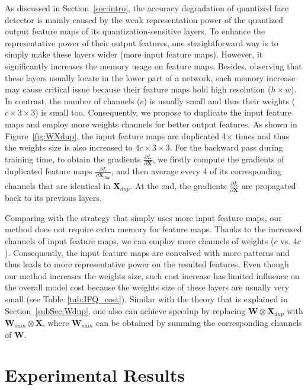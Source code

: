 \documentclass[10pt,twocolumn,letterpaper]{article}
\begin{document}
As discussed in Section~\ref{sec:intro}, the accuracy degradation of quantized face detector is mainly caused by the weak representation power of the quantized output feature maps of its quantization-sensitive layers. To enhance the representative power of their output features, one straightforward way is to simply make these layers wider (more input feature maps). However, it significantly increases the memory usage on feature maps.  Besides, observing that these layers usually locate in the lower part of a network, such memory increase may cause critical issue because their feature maps hold high resolution ($h \times w$). In contrast, the number of channels ($c$) is usually small and thus their weights ($c \times 3 \times 3$) is small too. Consequently, we propose to  duplicate the input feature maps and employ more weights channels for better output features. As shown in Figure~\ref{fig:WXdup}, the input feature maps are duplicated 4$\times$ times and thus the weights size is also increased to $4c \times 3 \times 3$. For the backward pass during training time, to obtain the gradients $ \frac{\partial L}{\partial \textbf{X}}$, we firstly compute the gradients of duplicated feature maps $\frac{\partial L}{\partial \textbf{X}_{dup}}$, and then average every 4 of its corresponding channels that are identical in $\textbf{X}_{dup}$. At the end, the gradients $ \frac{\partial L}{\partial \textbf{X}}$  are propagated back to its previous layers.

Comparing  with the strategy that simply uses more input feature maps, our method does not require extra memory for feature maps. Thanks to the increased channels of input feature maps, we can employ more channels of weights ($c$ vs. $4c$). Consequently, the input feature maps are convolved with more patterns and thus leads to more representative power on the resulted features. Even though our method increases the weights size, such cost increase has limited influence on the overall model cost because the weights size of these layers are usually very small (see Table~\ref{tab:IFQ_cost}). Similar with the theory that is explained in Section~\ref{subSec:Wdup}, one also can achieve speedup by replacing  $\textbf{W} \otimes \textbf{X}_{dup}$ with $\textbf{W}_{sum} \otimes \textbf{X}$,  where $\textbf{W}_{sum}$ can be obtained by summing the corresponding channels of $\textbf{W}$.

\section{Experimental Results}
\end{document}
